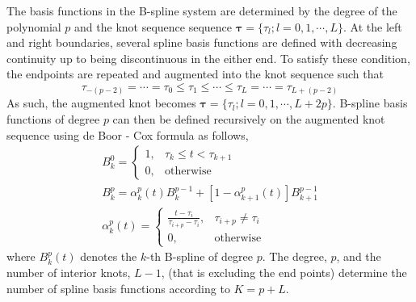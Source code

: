 The basis functions in the B-spline system are determined by the degree of the polynomial $p$ and the knot sequence sequence $\boldsymbol{\tau}=\{\tau_l; l = 0,1,\cdots, L\}$.
At the left and right boundaries, several spline basis functions are defined with decreasing continuity up to being discontinuous in the either end.
To satisfy these condition, the endpoints are repeated and augmented into the knot sequence such that
\begin{equation}
	\tau_{-(p-2)} = \cdots = \tau_{0} \leq \tau_{1} \leq \cdots \leq \tau_{L} = \cdots = \tau_{L+(p-2)} 
\label{eq:augmented_knots}
\end{equation}
As such, the augmented knot becomes $\boldsymbol{\tau}=\{\tau_l; l = 0,1,\cdots, L + 2p\}$.
B-spline basis functions of degree $p$ can then be defined recursively on the augmented knot sequence using de Boor - Cox formula as follows, 
\begin{equation}
	\begin{split}
		B^0_k = 
			\begin{cases}
				1, & \tau_k \leq t < \tau_{k+1} \\
			0, & \text{otherwise}
	\end{cases} \\
	B^p_k =  \alpha^p_k (t) B^{p-1}_k + \left[1 - \alpha^p_{k+1} (t)\right] B^{p-1}_{k+1} \\
	\alpha^p_k (t) =
	\begin{cases}
				\frac{t - \tau_i}{\tau_{i+p}-\tau_i}, & \tau_{i+p} \neq \tau_i \\
			  0, & \text{otherwise}
	\end{cases}
	\end{split} 
\label{eq:}
\end{equation}
where $B_k^p (t)$ denotes the $k$-th B-spline of degree $p$.
The degree, $p$, and the number of interior knots, $L-1$, (that is excluding the end points) determine the number of spline basis functions according to $K = p + L$.

